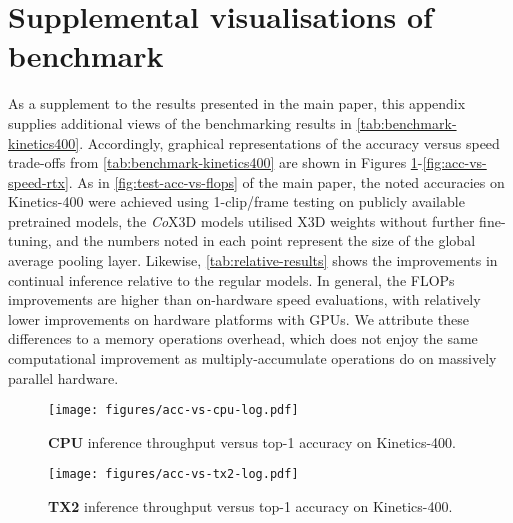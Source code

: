 
\section{Supplemental visualisations of benchmark}
As a supplement to the results presented in the main paper, this appendix supplies additional views of the benchmarking results in \cref{tab:benchmark-kinetics400}.
Accordingly, graphical representations of the accuracy versus speed trade-offs from \cref{tab:benchmark-kinetics400} are shown in Figures \ref{fig:acc-vs-speed-cpu}-\ref{fig:acc-vs-speed-rtx}.
As in \cref{fig:test-acc-vs-flops} of the main paper, the noted accuracies on Kinetics-400 were achieved using 1-clip/frame testing on publicly available pretrained models, the \textit{Co}X3D models utilised X3D weights without further fine-tuning, and the numbers noted in each point represent the size of the global average pooling layer.
Likewise, \cref{tab:relative-results} shows the improvements in continual inference relative to the regular models.
In general, the FLOPs improvements are higher than on-hardware speed evaluations, with relatively lower improvements on hardware platforms with GPUs. 
We attribute these differences to a memory operations overhead, which does not enjoy the same computational improvement as multiply-accumulate operations do on massively parallel hardware.

\begin{figure}[b]
    \centering
    \texttt{[image: figures/acc-vs-cpu-log.pdf]}
    \caption{\textbf{CPU} inference throughput versus top-1 accuracy on Kinetics-400. } 
    \label{fig:acc-vs-speed-cpu}
\end{figure}


\begin{figure}[b]
    \centering
    \texttt{[image: figures/acc-vs-tx2-log.pdf]}
    \caption{\textbf{TX2} inference throughput versus top-1 accuracy on Kinetics-400. }
    \label{fig:acc-vs-speed-tx2}
\end{figure}



